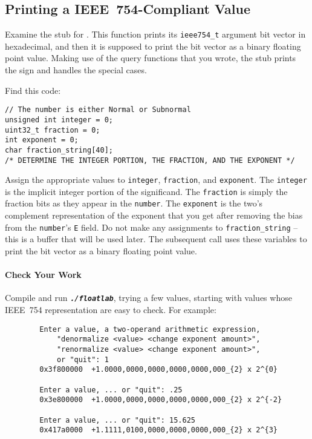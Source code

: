 \subsection{Printing a IEEE~754-Compliant Value} \label{subsec:printing}

Examine the stub for .
This function prints its \lstinline{ieee754_t} argument bit vector in hexadecimal, and then it is supposed to print the bit vector as a binary floating point value.
Making use of the query functions that you wrote, the stub prints the sign and handles the special cases.

Find this code:

\begin{lstlisting}
// The number is either Normal or Subnormal
unsigned int integer = 0;
uint32_t fraction = 0;
int exponent = 0;
char fraction_string[40];
/* DETERMINE THE INTEGER PORTION, THE FRACTION, AND THE EXPONENT */
\end{lstlisting}

Assign the appropriate values to \lstinline{integer}, \lstinline{fraction}, and \lstinline{exponent}.
The \lstinline{integer} is the implicit integer portion of the significand.
The \lstinline{fraction} is simply the fraction bits as they appear in the \lstinline{number}.
The \lstinline{exponent} is the two's complement representation of the exponent that you get after removing the bias from the \lstinline{number}'s \texttt{E} field.
Do not make any assignments to \lstinline{fraction_string} -- this is a buffer that will be used later.
The subsequent  call uses these variables to print the bit vector as a binary floating point value.

\paragraph*{Check Your Work}

Compile and run \texttt{\textbf{\textit{./floatlab}}}, trying a few values, starting with values whose IEEE~754 representation are easy to check.
For example:

\begin{verbatim}
        Enter a value, a two-operand arithmetic expression,
            "denormalize <value> <change exponent amount>",
            "renormalize <value> <change exponent amount>",
            or "quit": 1
        0x3f800000	+1.0000,0000,0000,0000,0000,000_{2} x 2^{0}

        Enter a value, ... or "quit": .25
        0x3e800000	+1.0000,0000,0000,0000,0000,000_{2} x 2^{-2}

        Enter a value, ... or "quit": 15.625
        0x417a0000	+1.1111,0100,0000,0000,0000,000_{2} x 2^{3}
\end{verbatim}

